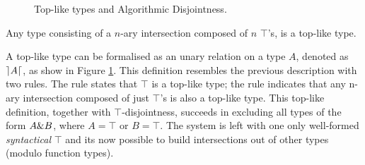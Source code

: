 \begin{figure}[h]


  \caption{Top-like types and Algorithmic Disjointness.}
  \label{fig:tltypesdis}
\end{figure}

\begin{definition}
  Any type consisting of a $n$-ary intersection composed of $n$ $\top$'s, is a top-like type. 
\end{definition}

A top-like type can be formalised as an unary relation on a type $A$, denoted as $\rceil A \lceil$, as show in 
Figure \ref{fig:tltypesdis}.
This definition resembles the previous description with two rules.
The rule  states that $\top$ is a top-like type; 
the rule  indicates that any n-ary intersection composed of just $\top$'s is also a top-like type.
This top-like definition, together with $\top$-disjointness, 
succeeds in excluding all types of the form $A \& B$, where $A = \top$ or $B = \top$.
The system is left with one only well-formed \emph{syntactical} $\top$ and its now possible to build 
intersections out of other types (modulo function types).

